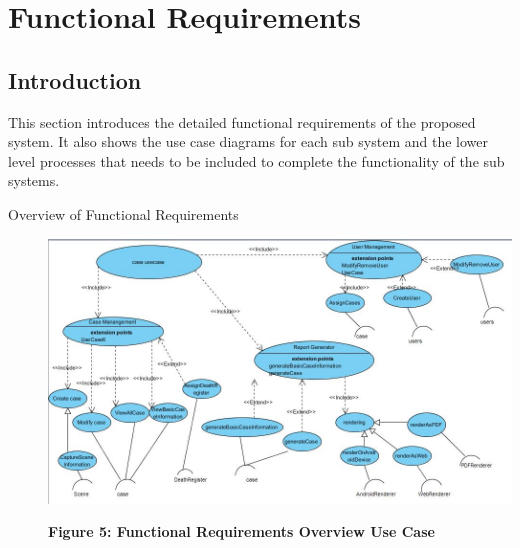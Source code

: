 \documentclass[10pt,a4paper]{article}
\begin{document}
\section{Functional Requirements}
\subsection{Introduction}
This section introduces the detailed functional requirements of the proposed system. It also shows the use case diagrams for each sub system and the lower level processes that needs to be included to complete the functionality of the sub systems.  
\begin{description}
	\item [Overview of Functional Requirements]
	\begin{center}
		\includegraphics[scale=0.4]{main-overview.jpg}
		
		\textbf{Figure 5: Functional Requirements Overview Use Case}
	\end{center}
\end{description}
\end{document}
